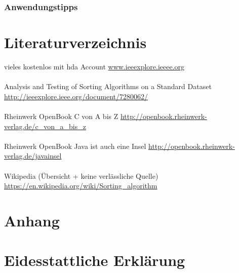 \documentclass{article}
\begin{document}
\subsubsection{Anwendungstipps}



\section{Literaturverzeichnis}
vieles kostenlos mit hda Account  \url {www.ieeexplore.ieeee.org} \\ \\
Analysis and Testing of Sorting Algorithms on a 
Standard Dataset \url {http://ieeexplore.ieee.org/document/7280062/}\\ \\
Rheinwerk OpenBook C von A bis Z \url {http://openbook.rheinwerk-verlag.de/c_von_a_bis_z} \\ \\
Rheinwerk OpenBook Java ist auch eine Insel \url {http://openbook.rheinwerk-verlag.de/javainsel} \\ \\
Wikipedia (Übersicht + keine verlässliche Quelle) \url {https://en.wikipedia.org/wiki/Sorting_algorithm}

\section{Anhang}

\section{Eidesstattliche Erklärung}
\end{document}
